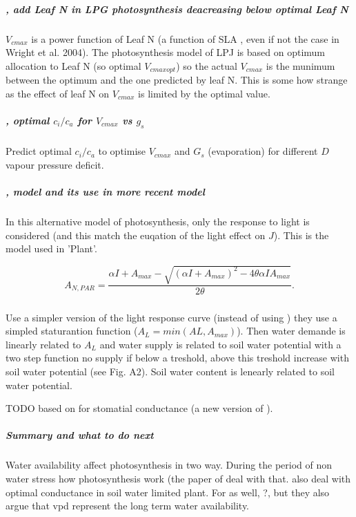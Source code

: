 \documentclass[a4paper,11pt]{article}
\begin{document}
\subparagraph{\citet{Sakschewski-2015}, add Leaf N in LPG photosynthesis deacreasing below optimal Leaf N}

$V_{cmax}$ is a power function of Leaf N (a function of SLA , even if
not the case in Wright et al. 2004). The photosynthesis model of LPJ
is based on optimum allocation to Leaf N (so optimal $V_{cmax opt}$) so
the actual $V_{cmax}$ is the munimum between the optimum and the one
predicted by leaf N. This is some how strange as the effect of leaf N
on $V_{cmax}$ is limited by the optimal value.

\subparagraph{\citet{Prentice-2014}, optimal $c_i/c_a$ for $V_{cmax}$ vs $g_s$}

Predict optimal $c_i/c_a$ to optimise $V_{cmax}$ and $G_s$ (evaporation) for different $D$ vapour pressure deficit.

\subparagraph{\citet{Johnson-1984}, model and its use in more recent model}

In this alternative model of photosynthesis, only the response to
light is considered (and this match the euqation of the light effect
on $J$). This is the model used in 'Plant'.

\begin{equation}
\label{eq:Johnson}
A_{N,PAR} = \frac{ \alpha I + A_{max} - \sqrt{(\alpha I + A_{max})^2 - 4 \theta \alpha I A_{max}}}{2\theta}.
\end{equation}

\subparagraph{\citet{Farrior-2013}}

Use a simpler version of the light response curve (instead of using
\citet{Johnson-1984}) they use a simpled staturantion function
($A_L = min(AL, A_{max})$). Then water demande is linearly related to
$A_L$ and water supply is related to soil water potential with a two
step function no supply if below a treshold, above this treshold
increase with soil water potential (see Fig. A2). Soil water content
is lenearly related to soil water potential.

TODO \citet{Zavala-2005} based on \citet{leuning-1995} for stomatial
conductance (a new version of \citet{Collatz-1991}).

\subparagraph{Summary and what to do next}

Water availability affect photosynthesis in two way. During the period
of non water stress how photosynthesis work (the paper of
\citet{Wright-2003} deal with that. \citet{Medlyn-2011a} also deal
with optimal conductance in soil water limited plant.  For
\citet{Prentice-2014} as well, ?, but they also argue that vpd
represent the long term water availability.
\end{document}
